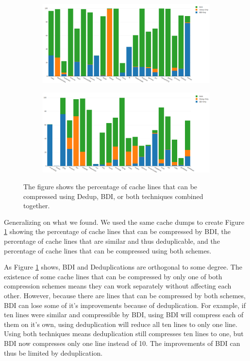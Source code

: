 \begin{figure}
    \begin{subfigure}[t]{\textwidth}
        \includegraphics[width=\textwidth]{CompPotential1.png}
    \end{subfigure}
    \begin{subfigure}[b]{\textwidth}
        \includegraphics[width=\textwidth]{CompPotential2.png}
    \end{subfigure}
    \caption[Compressible lines]{The figure shows the percentage of cache lines that can be compressed using Dedup, BDI, or both techniques combined together.}
    \label{fig:CompPossibility}
\end{figure}
Generalizing on what we found. We used the same cache dumps to create Figure \ref{fig:CompPossibility} showing the percentage of cache lines that can be compressed by BDI, the percentage of cache lines that are similar and thus deduplicable, and the percentage of cache lines that can be compressed using both schemes.\par
As Figure \ref{fig:CompPossibility} shows, BDI and Deduplications are orthogonal to some degree. The existence of some cache lines that can be compressed by only one of both compression schemes means they can work separately without affecting each other. However, because there are lines that can be compressed by both schemes, BDI can lose some of it's improvements because of deduplication. For example, if ten lines were similar and compressible by BDI, using BDI will compress each of them on it's own, using deduplication will reduce all ten lines to only one line. Using both techniques means deduplication still compresses ten lines to one, but BDI now compresses only one line instead of 10. The improvements of BDI can thus be limited by deduplication.\par
